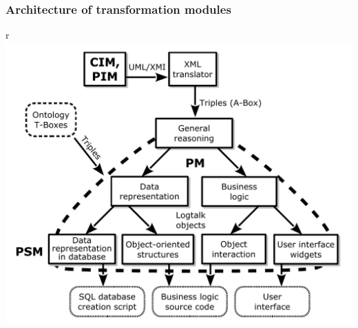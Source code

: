 \documentclass[10pt]{beamer}
\begin{document}
\begin{frame}
  \frametitle{Architecture of transformation modules}
  \centering
r  \includegraphics[width=0.9\linewidth]{architect_tree_pres-en-wo-OCL.pdf}
\end{frame}
\end{document}
